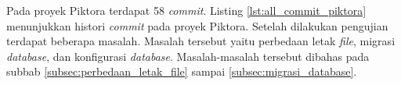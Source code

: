
Pada proyek Piktora terdapat 58 \textit{commit}. Listing \ref{lst:all_commit_piktora} menunjukkan histori \textit{commit} pada proyek Piktora. Setelah dilakukan pengujian terdapat beberapa masalah. Masalah tersebut yaitu perbedaan letak \textit{file}, migrasi \textit{database}, dan konfigurasi \textit{database}. Masalah-masalah tersebut dibahas pada subbab \ref{subsec:perbedaan_letak_file} sampai \ref{subsec:migrasi_database}.

